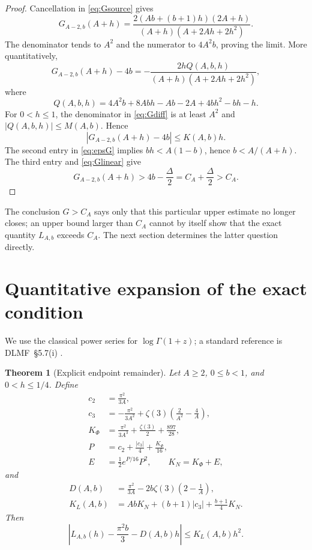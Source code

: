 \documentclass[11pt]{article}
\newtheorem{theorem}{Theorem}
\theoremstyle{remark}
\begin{document}
\begin{proof}
Cancellation in \eqref{eq:Gsource} gives
\begin{equation}
 G_{A-2,b}(A+h)=
 \frac{2(Ab+(b+1)h)(2A+h)}
 {(A+h)(A+2Ah+2h^2)}.                                   \label{eq:Grational}
\end{equation}
The denominator tends to $A^2$ and the numerator to $4A^2b$, proving the
limit.  More quantitatively,
\begin{equation}
 G_{A-2,b}(A+h)-4b
 =-\frac{2hQ(A,b,h)}{(A+h)(A+2Ah+2h^2)},                 \label{eq:Gdiff}
\end{equation}
where
\[
 Q(A,b,h)=4A^2b+8Abh-Ab-2A+4bh^2-bh-h.
\]
For $0<h\leq1$, the denominator in \eqref{eq:Gdiff} is at least $A^2$
and $|Q(A,b,h)|\leq M(A,b)$.  Hence
\begin{equation}
 |G_{A-2,b}(A+h)-4b|\leq K(A,b)h.                       \label{eq:Glinear}
\end{equation}
The second entry in \eqref{eq:epsG} implies
$bh<A(1-b)$, hence $b<A/(A+h)$.  The third entry and
\eqref{eq:Glinear} give
\[
 G_{A-2,b}(A+h)>4b-\frac\Delta2
  =C_A+\frac\Delta2>C_A.
\]
\end{proof}

The conclusion $G>C_A$ says only that this particular upper estimate no
longer closes; an upper bound larger than $C_A$ cannot by itself show that
the exact quantity $L_{A,b}$ exceeds $C_A$.  The next section determines
the latter question directly.

\section{Quantitative expansion of the exact condition}

We use the classical power series for $\log\Gamma(1+z)$; a standard
reference is DLMF~\S5.7(i) \cite{dlmf}.

\begin{theorem}[Explicit endpoint remainder]\label{thm:remainder}
Let $A\geq2$, $0\leq b<1$, and $0<h\leq1/4$.  Define
\begin{align*}
 c_2&=\frac{\pi^2}{3A},\\
 c_3&=-\frac{\pi^2}{3A^2}
       +\zeta(3)\left(\frac2{A^2}-\frac4A\right),\\
 K_\Phi&=\frac{\pi^2}{3A^3}+\frac{\zeta(3)}2+\frac{897}{28},\\
 P&=c_2+\frac{|c_3|}{4}+\frac{K_\Phi}{16},\\
 E&=\frac12 e^{P/16}P^2,\qquad K_N=K_\Phi+E,
\end{align*}
and
\begin{align}
 D(A,b)&=\frac{\pi^2}{3A}
       -2b\zeta(3)\left(2-\frac1A\right),                \label{eq:D}\\
 K_L(A,b)&=AbK_N+(b+1)|c_3|+\frac{b+1}{4}K_N.             \label{eq:KL}
\end{align}
Then
\begin{equation}
 \left|L_{A,b}(h)-\frac{\pi^2b}{3}-D(A,b)h\right|
 \leq K_L(A,b)h^2.                                      \label{eq:mainbound}
\end{equation}
\end{theorem}
\end{document}
